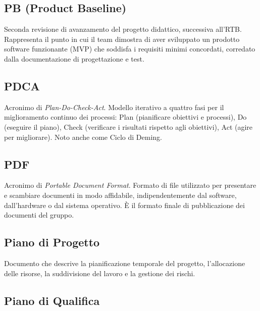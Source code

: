 \documentclass[a4paper, 11pt, oneside]{scrartcl} %
\begin{document}
\vspace{0.5cm}

\subsection*{PB (Product Baseline)}
Seconda revisione di avanzamento del progetto didattico, successiva all'RTB. Rappresenta il punto in cui il team dimostra di aver sviluppato un prodotto software funzionante (MVP) che soddisfa i requisiti minimi concordati, corredato dalla documentazione di progettazione e test.
\vspace{0.5cm}

\subsection*{PDCA}
Acronimo di \textit{Plan-Do-Check-Act}. Modello iterativo a quattro fasi per il miglioramento continuo dei processi: Plan (pianificare obiettivi e processi), Do (eseguire il piano), Check (verificare i risultati rispetto agli obiettivi), Act (agire per migliorare). Noto anche come Ciclo di Deming.
\vspace{0.5cm}

\subsection*{PDF}
Acronimo di \textit{Portable Document Format}. Formato di file utilizzato per presentare e scambiare documenti in modo affidabile, indipendentemente dal software, dall'hardware o dal sistema operativo. È il formato finale di pubblicazione dei documenti del gruppo.
\vspace{0.5cm}

\subsection*{Piano di Progetto}


Documento che descrive la pianificazione temporale del progetto, l'allocazione delle risorse, la suddivisione del lavoro e la gestione dei rischi.

\vspace{0.5cm}

\subsection*{Piano di Qualifica}
\end{document}
